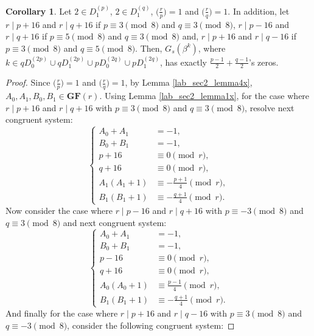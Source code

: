 \documentclass{mcom-l}
\theoremstyle{definition}
\newtheorem{sec3Bcor1}{Corollary}[section]
\numberwithin{equation}{section}
\begin{document}
   \begin{sec3Bcor1}\label{lab_sec3Bcor1}
   Let $ 2\in D_{1}^{(p)} $, $ 2\in D_{1}^{(q)} $, $ \bigl(\tfrac{r}{p}\bigr) =1$ and $ \bigl(\tfrac{r}{q}\bigr) =1$. In addition, let $ r\mid p+16 $ and $ r\mid q+16 $ if $ p\equiv 3 \pmod 8 $ and $ q\equiv 3 \pmod 8 $, $ r\mid p-16 $ and $ r\mid q+16 $ if $ p\equiv 5 \pmod 8 $ and $ q\equiv 3 \pmod 8 $ and, $ r\mid p+16 $ and $ r\mid q-16 $ if $ p\equiv 3 \pmod 8 $ and $ q\equiv 5 \pmod 8 $. Then, $ G_{s}(\beta^{k}) $, where  $ k\in qD_{0}^{(2p)}\cup  qD_{1}^{(2p)}\cup pD_{0}^{(2q)}\cup  pD_{1}^{(2q)} $, has exactly $ \tfrac{p-1}{2}+\tfrac{q-1}{2} $'s zeros.
   \end{sec3Bcor1}
   \begin{proof}
   Since $ \bigl(\tfrac{r}{p}\bigr) =1$ and $ \bigl(\tfrac{r}{q}\bigr) =1$, by Lemma \ref{lab_sec2_lemma4x}, $ A_{0},A_{1},B_{0},B_{1} \in \mathbf{GF}(r)$. Using Lemma \ref{lab_sec2_lemma1x}, for the case where $ r\mid p+16 $ and $ r\mid q+16 $ with $ p\equiv 3 \pmod 8 $ and $ q\equiv 3 \pmod 8 $, resolve next congruent system:
   \begin{equation}\label{lab_sec3Bcor1_eq1}
   \begin{cases}
   A_{0}+A_{1}&=-1,\\
   B_{0}+B_{1}&=-1,\\
   p+16&\equiv 0 \pmod r,\\
   q+16&\equiv 0 \pmod r,\\
   A_{1}(A_{1}+1)&\equiv -\frac{p+1}{4} \pmod r,\\
   B_{1}(B_{1}+1)&\equiv -\frac{q+1}{4} \pmod r.
   \end{cases}
   \end{equation}
    Now consider the case where $ r\mid p-16 $ and $ r\mid q+16 $ with $ p\equiv -3 \pmod 8 $ and $ q\equiv 3 \pmod 8 $ and next congruent system:  
    \begin{equation}\label{lab_sec3Bcor1_eq2}
     \begin{cases}
     A_{0}+A_{1}&=-1,\\
     B_{0}+B_{1}&=-1,\\
     p-16&\equiv 0 \pmod r,\\
     q+16&\equiv 0 \pmod r,\\
     A_{0}(A_{0}+1)&\equiv \frac{p-1}{4} \pmod r,\\
     B_{1}(B_{1}+1)&\equiv -\frac{q+1}{4} \pmod r.
     \end{cases}
     \end{equation}
   And finally for the case where $ r\mid p+16 $ and $ r\mid q-16 $ with $ p\equiv 3 \pmod 8 $ and $ q\equiv -3 \pmod 8 $, consider the following  congruent system: 

\end{proof}
\end{document}
